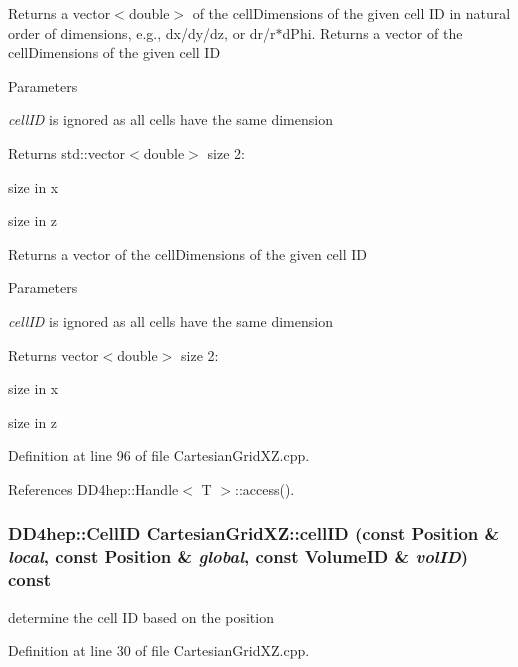 Returns a vector$<$double$>$ of the cellDimensions of the given cell ID in natural order of dimensions, e.g., dx/dy/dz, or dr/r$\ast$dPhi. Returns a vector of the cellDimensions of the given cell ID 
\begin{DoxyParams}{Parameters}
\item[{\em cellID}]is ignored as all cells have the same dimension \end{DoxyParams}
\begin{DoxyReturn}{Returns}
std::vector$<$double$>$ size 2:
\begin{DoxyEnumerate}
\item size in x
\item size in z
\end{DoxyEnumerate}
\end{DoxyReturn}
Returns a vector of the cellDimensions of the given cell ID 
\begin{DoxyParams}{Parameters}
\item[{\em cellID}]is ignored as all cells have the same dimension \end{DoxyParams}
\begin{DoxyReturn}{Returns}
vector$<$double$>$ size 2:
\begin{DoxyEnumerate}
\item size in x
\item size in z 
\end{DoxyEnumerate}
\end{DoxyReturn}


Definition at line 96 of file CartesianGridXZ.cpp.

References DD4hep::Handle$<$ T $>$::access().\hypertarget{class_d_d4hep_1_1_geometry_1_1_cartesian_grid_x_z_a33d11d661bea782691e6e862922e5332}{
\subsubsection[{cellID}]{\setlength{\rightskip}{0pt plus 5cm}DD4hep::CellID CartesianGridXZ::cellID (const {\bf Position} \& {\em local}, \/  const {\bf Position} \& {\em global}, \/  const VolumeID \& {\em volID}) const}}
\label{class_d_d4hep_1_1_geometry_1_1_cartesian_grid_x_z_a33d11d661bea782691e6e862922e5332}


determine the cell ID based on the position 

Definition at line 30 of file CartesianGridXZ.cpp.

